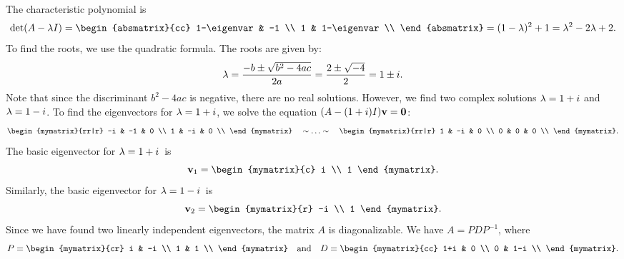 \begin{solution}
  The characteristic polynomial is
  \begin{equation*}
    \det(A-\eigenvar I)
    = \begin{absmatrix}{cc}
      1-\eigenvar & -1 \\
      1 & 1-\eigenvar \\
    \end{absmatrix}
    = (1-\eigenvar)^2 + 1
    = \eigenvar^2 - 2\eigenvar + 2.
  \end{equation*}
  To find the roots, we use the quadratic formula. The roots are given
  by:
  \begin{equation*}
    \lambda
    = \frac{-b\pm\sqrt{b^2-4ac}}{2a}
    = \frac{2\pm\sqrt{-4}}{2} = 1\pm i.
  \end{equation*}
  Note that since the discriminant $b^2-4ac$ is negative, there are no
  real solutions. However, we find two complex solutions $\lambda=1+i$
  and $\lambda=1-i$. To find the eigenvectors for $\lambda=1+i$, we
  solve the equation $(A-(1+i)I)\mbox{\bf v}=\mbox{\bf 0}$:
  \begin{equation*}
    \begin{mymatrix}{rr|r}
      -i & -1 & 0 \\
      1 & -i & 0 \\
    \end{mymatrix}
    \quad\roweq\ldots\roweq\quad
    \begin{mymatrix}{rr|r}
      1 & -i & 0 \\
      0 & 0 & 0 \\
    \end{mymatrix}.
  \end{equation*}
  The basic eigenvector for $\lambda=1+i$\, is
  \begin{equation*}
    \vect{v}_1 = \begin{mymatrix}{c} i \\ 1 \end{mymatrix}.
  \end{equation*}
  Similarly, the basic eigenvector for $\lambda=1-i$\, is
  \begin{equation*}
    \vect{v}_2 = \begin{mymatrix}{r} -i \\ 1 \end{mymatrix}.
  \end{equation*}
  Since we have found two linearly independent eigenvectors, the
  matrix $A$ is diagonalizable. We have $A=PDP^{-1}$, where
  \begin{equation*}
    P =
    \begin{mymatrix}{cr}
      i & -i \\
      1 &  1 \\
    \end{mymatrix}
    \quad\mbox{and}\quad
    D =
    \begin{mymatrix}{cc}
      1+i &  0 \\
      0 & 1-i \\
    \end{mymatrix}.
  \end{equation*}
\end{solution}

